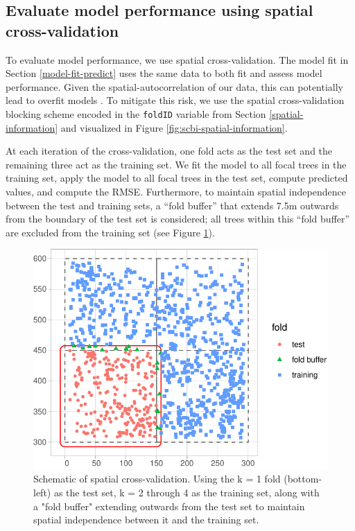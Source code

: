 \documentclass[12pt]{article}
\begin{document}
\hypertarget{spatial-cross-validation}{%
\subsection{Evaluate model performance using spatial
cross-validation}\label{spatial-cross-validation}}

To evaluate model performance, we use spatial cross-validation. The
model fit in Section \ref{model-fit-predict} uses the same data to both
fit and assess model performance. Given the spatial-autocorrelation of
our data, this can potentially lead to overfit models
\citep{roberts_cross-validation_2017}. To mitigate this risk, we use the
spatial cross-validation blocking scheme encoded in the \texttt{foldID}
variable from Section \ref{spatial-information} and visualized in Figure
\ref{fig:scbi-spatial-information}.

At each iteration of the cross-validation, one fold acts as the test set
and the remaining three act as the training set. We fit the model to all
focal trees in the training set, apply the model to all focal trees in
the test set, compute predicted values, and compute the RMSE.
Furthermore, to maintain spatial independence between the test and
training sets, a ``fold buffer'' that extends 7.5m outwards from the
boundary of the test set is considered; all trees within this ``fold
buffer'' are excluded from the training set (see Figure
\ref{fig:scbi-spatial-cross-validation-schematic}).

\begin{figure}

{\centering \includegraphics[width=0.66\linewidth]{Figures/scbi-spatial-cross-validation-schematic-1} 

}

\caption{Schematic of spatial cross-validation. Using the k = 1 fold (bottom-left) as the test set, k = 2 through 4 as the training set, along with a "fold buffer" extending outwards from the test set to maintain spatial independence between it and the training set.}\label{fig:scbi-spatial-cross-validation-schematic}
\end{figure}
\end{document}
